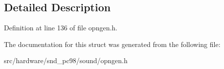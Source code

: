 \subsection{Detailed Description}


Definition at line 136 of file opngen.\-h.



The documentation for this struct was generated from the following file\-:\begin{DoxyCompactItemize}
\item 
src/hardware/snd\-\_\-pc98/sound/opngen.\-h\end{DoxyCompactItemize}
